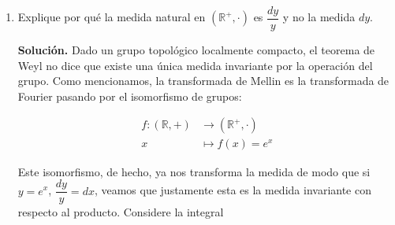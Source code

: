 \documentclass[12pt, a4paper]{article}
\begin{document}
\begin{enumerate}
Ahora tome $s=\sigma+it$ de manera que $ds=idt$,

\begin{align*}
f(e^x)&=\frac{1}{2\pi i}\int_{c-i\infty}^{c+i\infty}\mathcal{M}(f)(s)e^{-xs}ds\\
&=\frac{e^{-x\sigma}}{2\pi}\int_{\mathbb{R}}\mathcal{M}(f)(\sigma+it)e^{-xit}dt\\
&=\int_{\mathbb{R}}e^{-x\sigma}\mathcal{M}(f)(\sigma-2\pi iw)e^{2\pi i wx}dw
.\end{align*}

Ahora bien, la transformada de Mellin se puede escribir como una transformada de Fourier, note que

\begin{align*}
  \mathcal{M}(f)\left(\sigma-2\pi iw\right)&=\widehat{f\circ e}\left(\frac{\sigma}{2 \pi}i+w\right)\\
  &=\int_\mathbb{R}f(e^x)e^{-2\pi i x\left((2\pi)^{-1}\sigma i+w\right)}dx\\
  &=\int_\mathbb{R}f(e^x)e^{x\sigma}e^{-2\pi ixw}dx\\
  &=\widehat{e^{x\sigma}f \circ e}(w),
  \end{align*}

por lo que finalmente, obtenemos que,

$$e^{x\sigma}f(e^x)=\int_{\mathbb{R}}\widehat{e^{x\sigma}f\circ e}(w)e^{2\pi i wx}dw.$$

Esto es justamente lo esperado de aplicar inversión de Fourier $\widehat{e^{x\sigma}f\circ e}$ siempre que esto sea posible.

\item Explique por qué la medida natural en $(\mathbb{R}^+, \cdot)$ es $\dfrac{dy}{y}$ y no la medida $dy$.

\textbf{Solución.}
Dado un grupo topológico localmente compacto, el teorema de Weyl no dice que existe una única medida invariante por la operación del grupo. Como mencionamos, la transformada de Mellin es la transformada de Fourier pasando por el isomorfismo de grupos:

\begin{align*}
  f : (\mathbb{R},+) &\longrightarrow (\mathbb{R}^+,\cdot) \\
  x &\longmapsto f(x) = e^x
\end{align*}

Este isomorfismo, de hecho, ya nos transforma la medida de modo que si $y=e^x$, $\dfrac{dy}{y}=dx$, veamos que justamente esta es la medida invariante con respecto al producto. Considere la integral


\end{enumerate}
\end{document}
